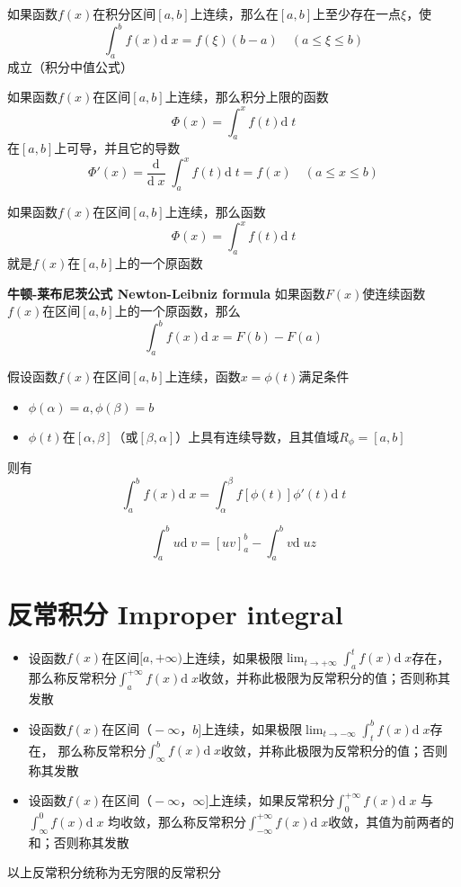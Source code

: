 \documentclass[UTF8]{ctexart}
\newcommand{\dif}[1]{\text{d}\;\!#1}
\newcommand{\dev}[1]{\frac{\text{d}}{\dif{#1}}\;\!}
\begin{document}
如果函数$f(x)$在积分区间$[a,b]$上连续，那么在$[a,b]$上至少存在一点$\xi$，使
\[ \int^b_af(x)\dif{x}=f(\xi)(b-a)\quad(a\le\xi\le b) \]
成立（积分中值公式）

如果函数$f(x)$在区间$[a,b]$上连续，那么积分上限的函数
\[ \Phi(x)=\int^x_af(t)\dif{t} \]
在$[a,b]$上可导，并且它的导数
\[ \Phi'(x)=\dev{x}\int^x_af(t)\dif{t}=f(x)\quad(a\le x\le b) \]

如果函数$f(x)$在区间$[a,b]$上连续，那么函数
\[ \Phi(x)=\int^x_af(t)\dif{t} \]
就是$f(x)$在$[a,b]$上的一个原函数

\textbf{牛顿-莱布尼茨公式 Newton-Leibniz formula}
如果函数$F(x)$使连续函数$f(x)$在区间$[a,b]$上的一个原函数，那么
\[ \int_a^bf(x)\dif{x}=F(b)-F(a) \]

\bigskip

假设函数$f(x)$在区间$[a,b]$上连续，函数$x=\phi(t)$满足条件
\begin{itemize}
  \item $\phi(\alpha)=a,\phi(\beta)=b$
  \item $\phi(t)$在$[\alpha,\beta]$（或$[\beta,\alpha]$）上具有连续导数，且其值域$R_\phi=[a,b]$
\end{itemize}
则有
\[ \int_a^bf(x)\dif{x}=\int_\alpha^\beta f[\phi(t)]\phi'(t)\dif{t} \]

\bigskip

\[ \int_a^bu\dif{v}=[uv]_a^b-\int_a^bv\dif{uz} \]

\bigskip
\bigskip

\section*{反常积分 Improper integral}

\bigskip

\begin{itemize}
  \item 设函数$f(x)$在区间$[a,+\infty)$上连续，如果极限$\displaystyle\lim_{t\to+\infty}\int_a^tf(x)\dif{x}$存在，
  那么称反常积分$\displaystyle\int_a^{+\infty}f(x)\dif{x}$收敛，并称此极限为反常积分的值；否则称其发散
  \item 设函数$f(x)$在区间$（-\infty，b]$上连续，如果极限$\displaystyle\lim_{t\to-\infty}\int_t^bf(x)\dif{x}$存在，
  那么称反常积分$\displaystyle\int_{\infty}^bf(x)\dif{x}$收敛，并称此极限为反常积分的值；否则称其发散
  \item 设函数$f(x)$在区间$（-\infty，\infty]$上连续，如果反常积分$\displaystyle\int_0^{+\infty}f(x)\dif{x}$ 与$\displaystyle\int_{\infty}^0f(x)\dif{x}$
  均收敛，那么称反常积分$\displaystyle\int_{-\infty}^{+\infty}f(x)\dif{x}$收敛，其值为前两者的和；否则称其发散
\end{itemize}
以上反常积分统称为无穷限的反常积分
\end{document}
